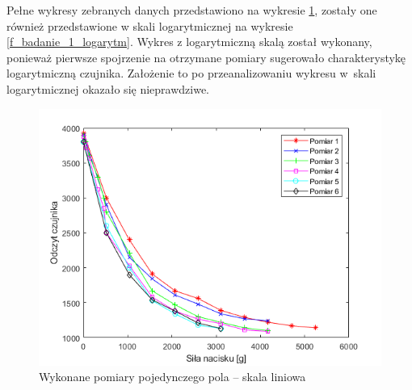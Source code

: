 
Pełne wykresy zebranych danych przedstawiono na wykresie \ref{f_badanie_1_standard}, zostały one również przedstawione w skali logarytmicznej na wykresie \ref{f_badanie_1_logarytm}. Wykres z logarytmiczną skalą został wykonany, ponieważ pierwsze spojrzenie na otrzymane pomiary sugerowało charakterystykę logarytmiczną czujnika. Założenie to po przeanalizowaniu wykresu w~skali logarytmicznej okazało się nieprawdziwe.

\begin{figure}[!h]
    \centering 
    \includegraphics[width=0.85\linewidth]{img/badanie_1_pomiar.png}
    \caption{Wykonane pomiary pojedynczego pola -- skala liniowa}
    \label{f_badanie_1_standard}
\end{figure}

